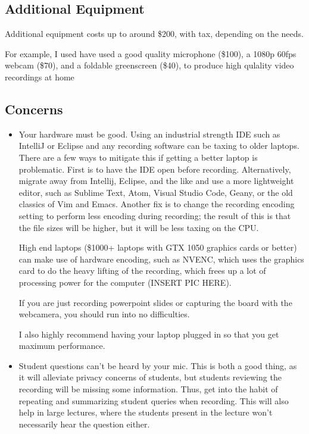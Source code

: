 \documentclass[sigconf]{acmart}
\begin{document}






\subsection{Additional Equipment}
Additional equipment costs up to around \$200, with tax, depending on the needs.

For example, I used have used a good quality microphone (\$100), a 1080p 60fps webcam (\$70), and a foldable greenscreen (\$40), to produce high qulality video recordings at home


\subsection{Concerns}
\begin{itemize}
	\item Your hardware must be good. Using an industrial strength IDE such as IntelliJ or Eclipse and any recording software can be taxing to older laptops.
	There are a few  ways to mitigate this  if getting a better laptop is problematic. 
	First is to have the IDE open before recording.
	Alternatively, migrate away from Intellij, Eclipse, and the like and use a more lightweight editor, such as Sublime Text, Atom, Visual Studio Code, Geany, or the old classics of Vim and Emacs.
	Another fix is to change the recording encoding setting to perform less encoding during recording; the result of this is that the file sizes will be higher, but it will be less taxing on the CPU.
	
	High end laptops (\$1000+ laptops with GTX 1050 graphics cards or better) can make use of hardware encoding, such as NVENC, which uses the graphics card to do the heavy lifting of the recording, which frees up a lot of processing power for the computer (INSERT PIC HERE).
	
	
	If you are just recording powerpoint slides or capturing the board with the webcamera, you should run into no difficulties.
	
	I also highly recommend having your laptop plugged in  so that you get maximum performance.
	\item Student questions can't be heard by your mic.  This is both a good thing, as it will alleviate privacy concerns of students, but students  reviewing the recording will be missing some information.  Thus, get into the habit of repeating and summarizing student queries when recording.  This will also help in large lectures, where the students present in the lecture won't necessarily hear the question either.
	
\end{itemize}
\end{document}
